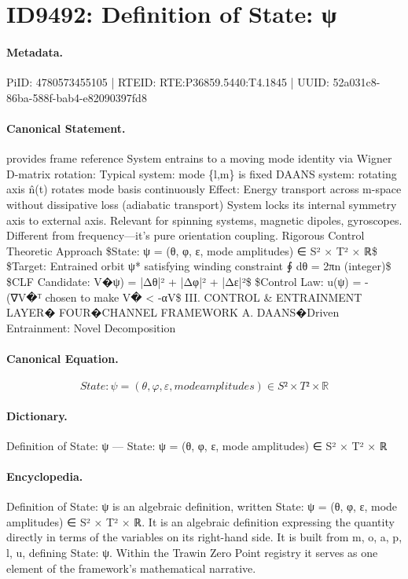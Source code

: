 \section*{ID9492: Definition of State: ψ}
\paragraph{Metadata.}
PiID: 4780573455105 | RTEID: RTE:P36859.5440:T4.1845 | UUID: 52a031c8-86ba-588f-bab4-e82090397fd8

\paragraph{Canonical Statement.}
provides frame reference System entrains to a moving mode identity via Wigner D-matrix rotation: Typical system: mode \{l,m\} is fixed DAANS system: rotating axis n̂(t) rotates mode basis continuously Effect: Energy transport across m-space without dissipative loss (adiabatic transport) System locks its internal symmetry axis to external axis. Relevant for spinning systems, magnetic dipoles, gyroscopes. Different from frequency—it's pure orientation coupling. Rigorous Control Theoretic Approach \$State: ψ = (θ, φ, ε, mode amplitudes) ∈ S² × T² × ℝ\$ \$Target: Entrained orbit ψ* satisfying winding constraint ∮ dθ = 2πn (integer)\$ \$CLF Candidate: V�ψ) = |Δθ|² + |Δφ|² + |Δε|²\$ \$Control Law: u(ψ) = -(∇V�ᵀ chosen to make V� < -αV\$ III. CONTROL \& ENTRAINMENT LAYER� FOUR�CHANNEL FRAMEWORK A. DAANS�Driven Entrainment: Novel Decomposition

\paragraph{Canonical Equation.}
\[
State: ψ = (θ, φ, ε, mode amplitudes) ∈ S² × T² × ℝ
\]

\paragraph{Dictionary.}
Definition of State: ψ — State: ψ = (θ, φ, ε, mode amplitudes) ∈ S² × T² × ℝ

\paragraph{Encyclopedia.}
Definition of State: ψ is an algebraic definition, written State: ψ = (θ, φ, ε, mode amplitudes) ∈ S² × T² × ℝ. It is an algebraic definition expressing the quantity directly in terms of the variables on its right-hand side. It is built from m, o, a, p, l, u, defining State: ψ. Within the Trawin Zero Point registry it serves as one element of the framework's mathematical narrative.
